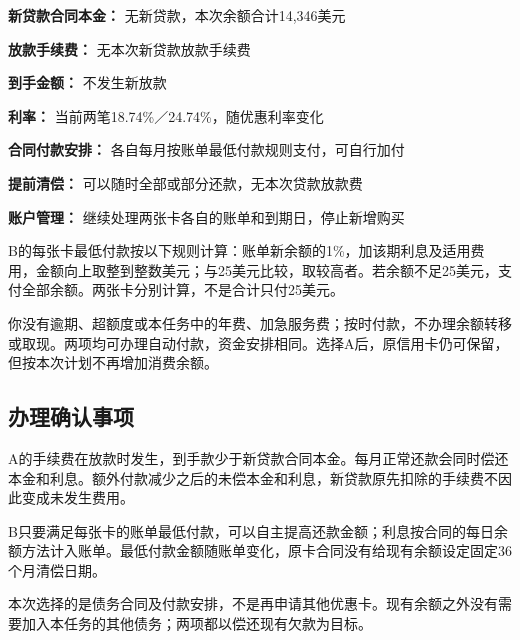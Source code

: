 \documentclass[UTF8,fontset=none,11pt,a4paper]{ctexart}
\begin{document}
\textbf{新贷款合同本金：} 无新贷款，本次余额合计14,346美元


\textbf{放款手续费：} 无本次新贷款放款手续费


\textbf{到手金额：} 不发生新放款


\textbf{利率：} 当前两笔18.74\%／24.74\%，随优惠利率变化


\textbf{合同付款安排：} 各自每月按账单最低付款规则支付，可自行加付


\textbf{提前清偿：} 可以随时全部或部分还款，无本次贷款放款费


\textbf{账户管理：} 继续处理两张卡各自的账单和到期日，停止新增购买


B的每张卡最低付款按以下规则计算：账单新余额的1\%，加该期利息及适用费用，金额向上取整到整数美元；与25美元比较，取较高者。若余额不足25美元，支付全部余额。两张卡分别计算，不是合计只付25美元。


你没有逾期、超额度或本任务中的年费、加急服务费；按时付款，不办理余额转移或取现。两项均可办理自动付款，资金安排相同。选择A后，原信用卡仍可保留，但按本次计划不再增加消费余额。


\subsection*{办理确认事项}
A的手续费在放款时发生，到手款少于新贷款合同本金。每月正常还款会同时偿还本金和利息。额外付款减少之后的未偿本金和利息，新贷款原先扣除的手续费不因此变成未发生费用。


B只要满足每张卡的账单最低付款，可以自主提高还款金额；利息按合同的每日余额方法计入账单。最低付款金额随账单变化，原卡合同没有给现有余额设定固定36个月清偿日期。


本次选择的是债务合同及付款安排，不是再申请其他优惠卡。现有余额之外没有需要加入本任务的其他债务；两项都以偿还现有欠款为目标。
\end{document}
